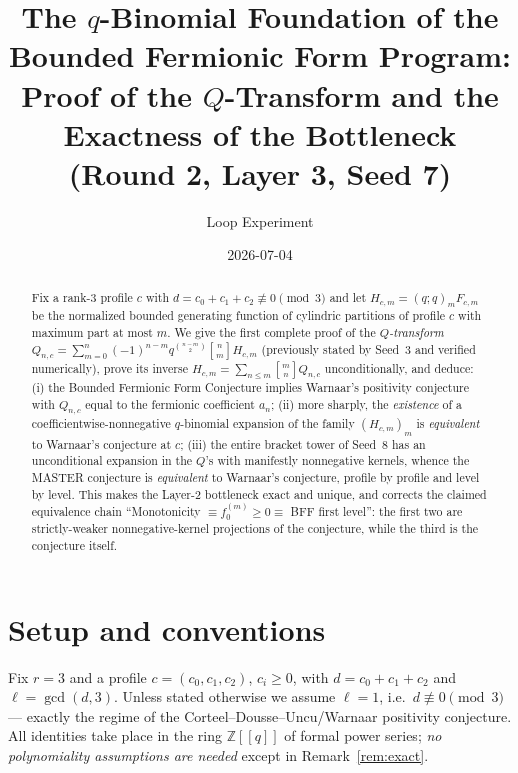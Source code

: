 \documentclass[11pt]{article}
\title{The $q$-Binomial Foundation of the Bounded Fermionic Form Program:\\
Proof of the $Q$-Transform and the Exactness of the Bottleneck\\
\large (Round 2, Layer 3, Seed 7)}
\author{Loop Experiment}
\date{2026-07-04}
\newcommand{\qbin}[2]{\genfrac{[}{]}{0pt}{}{#1}{#2}}
\newcommand{\ZZ}{\mathbb{Z}}
\begin{document}
\maketitle

\begin{abstract}
Fix a rank-$3$ profile $c$ with $d=c_0+c_1+c_2\not\equiv 0 \pmod 3$ and let
$H_{c,m}=(q;q)_m F_{c,m}$ be the normalized bounded generating function of cylindric
partitions of profile $c$ with maximum part at most $m$. We give the first complete proof
of the \emph{$Q$-transform} $Q_{n,c}=\sum_{m=0}^n(-1)^{n-m}q^{\binom{n-m}{2}}\qbin{n}{m}H_{c,m}$
(previously stated by Seed~3 and verified numerically), prove its inverse
$H_{c,m}=\sum_{n\le m}\qbin{m}{n}Q_{n,c}$ unconditionally, and deduce:
(i) the Bounded Fermionic Form Conjecture implies Warnaar's positivity conjecture with
$Q_{n,c}$ equal to the fermionic coefficient $a_n$; (ii) more sharply, the \emph{existence}
of a coefficientwise-nonnegative $q$-binomial expansion of the family $(H_{c,m})_m$ is
\emph{equivalent} to Warnaar's conjecture at $c$; (iii) the entire bracket tower of Seed~8
has an unconditional expansion in the $Q$'s with manifestly nonnegative kernels, whence the
MASTER conjecture is \emph{equivalent} to Warnaar's conjecture, profile by profile and level
by level. This makes the Layer-2 bottleneck exact and unique, and corrects the claimed
equivalence chain ``Monotonicity $\equiv f_0^{(m)}\ge 0\equiv$ BFF first level'': the first
two are strictly-weaker nonnegative-kernel projections of the conjecture, while the third is
the conjecture itself.
\end{abstract}

\section{Setup and conventions}

Fix $r=3$ and a profile $c=(c_0,c_1,c_2)$, $c_i\ge 0$, with $d=c_0+c_1+c_2$ and
$\ell=\gcd(d,3)$. Unless stated otherwise we assume $\ell=1$, i.e.\ $d\not\equiv0\pmod 3$
--- exactly the regime of the Corteel--Dousse--Uncu/Warnaar positivity conjecture. All
identities take place in the ring $\ZZ[[q]]$ of formal power series; \emph{no polynomiality
assumptions are needed} except in Remark~\ref{rem:exact}.
\end{document}
